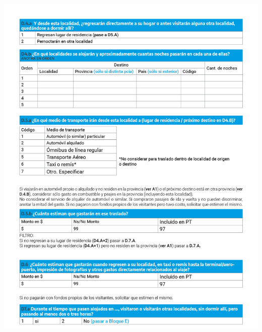 \documentclass[
]{book}
\begin{document}
\begin{center}\includegraphics[width=1\linewidth]{imagenes/graf06} \end{center}
\end{document}
